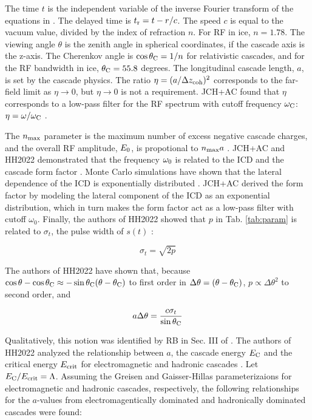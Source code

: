 \documentclass[amsmath,amssymb,aps,prd,10pt,twocolumn,showkeys]{revtex4}
\begin{document}
The time $t$ is the independent variable of the inverse Fourier transform of the equations in \cite{10.1103/physrevd.65.016003}. The delayed time is $t_{\rm r} = t-r/c$.  The speed $c$ is equal to the vacuum value, divided by the index of refraction $n$.  For RF in ice, $n=1.78$.  The viewing angle $\theta$ is the zenith angle in spherical coordinates, if the cascade axis is the z-axis.  The Cherenkov angle is $\cos\theta_{\rm C} = 1/n$ for relativistic cascades, and for the RF bandwidth in ice, $\theta_{\rm C} = 55.8$ degrees.  The longitudinal cascade length, $a$, is set by the cascade physics.  The ratio $\eta = (a/\Delta z_{\rm coh})^2$ corresponds to the far-field limit as $\eta \to 0$, but $\eta \to 0$ is not a requirement.  JCH+AC found that $\eta$ corresponds to a low-pass filter for the RF spectrum with cutoff frequency $\omega_{\rm C}$: $\eta = \omega/\omega_{\rm C}$ \cite{10.1016/j.astropartphys.2017.03.008}.

The $n_{\rm max}$ parameter is the maximum number of excess negative cascade charges, and the overall RF amplitude, $E_{\rm 0}$, is propotional to $n_{\rm max} a$ \cite{10.1103/physrevd.65.016003}.  JCH+AC and HH2022 demonstrated that the frequency $\omega_{\rm 0}$ is related to the ICD and the cascade form factor \cite{10.1016/j.astropartphys.2017.03.008,PhysRevD.105.123019}.  Monte Carlo simulations have shown that the lateral dependence of the ICD is exponentially distributed \cite{zhs,10.1016/j.astropartphys.2017.03.008}.  JCH+AC derived the form factor by modeling the lateral component of the ICD as an exponential distribution, which in turn makes the form factor act as a low-pass filter with cutoff $\omega_0$.  Finally, the authors of HH2022 showed that $p$ in Tab. \ref{tab:param} is related to $\sigma_t$, the pulse width of $s(t)$ \cite{PhysRevD.105.123019}:

\begin{equation}
\sigma_t = \sqrt{2p} \label{eq:pulse_width}
\end{equation}

The authors of HH2022 have shown that, because $\cos\theta - \cos\theta_{\rm C} \approx -\sin\theta_{\rm C}(\theta-\theta_{\rm C})$ to first order in $\Delta\theta=(\theta-\theta_{\rm C})$, $p \propto \Delta\theta^2$ to second order, and 

\begin{equation}
a\Delta\theta = \frac{c \sigma_t}{\sin\theta_{\rm C}} \label{eq:uncert}
\end{equation}

Qualitatively, this notion was identified by RB in Sec. III of \cite{10.1103/physrevd.65.016003}.  The authors of HH2022 analyzed the relationship between $a$, the cascade energy $E_{\rm C}$ and the critical energy $E_{\rm crit}$ for electromagnetic and hadronic cascades \cite{PhysRevD.105.123019}.  Let $E_{\rm C}/E_{\rm crit} = \Lambda$.  Assuming the Greisen and Gaisser-Hillas parameterizaions for electromagnetic and hadronic cascades, respectively, the following relationships for the $a$-values from electromagentically dominated and hadronically dominated cascades were found:
\end{document}
